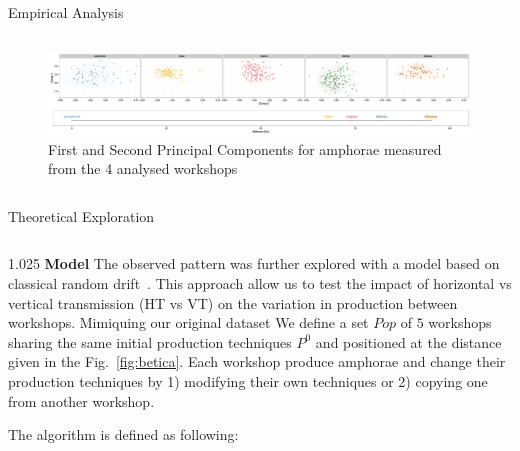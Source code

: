 \documentclass[final]{beamer}
\newlength{\onecolwid}
\newlength{\twocolwid}
\begin{document}
\begin{frame}[t]
\begin{columns}[t]
\begin{column}{\twocolwid}
\begin{block}{Empirical Analysis}
\begin{columns}[t,totalwidth=\twocolwid]
\begin{column}{\twocolwid} %
\begin{figure}
\includegraphics[width=0.6\linewidth]{images/fig2.png}
\singlespace
\caption{First and Second Principal Components for amphorae measured from the 4 analysed workshops}
\label{fig:pca}
\end{figure}
\end{column}
\end{columns}
\end{block}
\vspace{-1cm}
\begin{block}{Theoretical Exploration}

\begin{columns}[t,totalwidth=\twocolwid]

\begin{column}{1.025\onecolwid} %
{\textbf{Model }}
\justify
The observed pattern was further explored with a model based on classical random drift~\cite{bentley2004randomdriftandculturechange}. This approach allow us to test the impact of horizontal vs vertical transmission (HT vs VT) on the variation in production between workshops.  
Mimiquing our original dataset We define a set $Pop$ of $5$ workshops sharing the same initial production techniques $P^{0}$ and positioned at the distance given in the Fig.~\ref{fig:betica}.
Each workshop produce amphorae and change their production techniques by 1) modifying their own techniques or 2) copying one from another workshop.

The algorithm is defined as following:   


\begin{center}
\end{center}
\end{column}
\end{columns}
\end{block}
\end{column}
\end{columns}
\end{frame}
\end{document}
